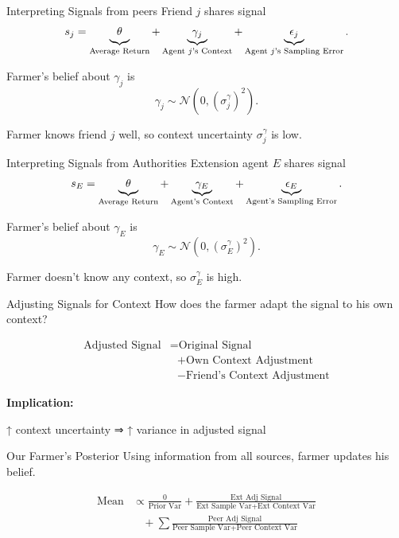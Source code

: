 \documentclass[
  ignorenonframetext,
]{beamer}
\begin{document}
\begin{frame}{Interpreting Signals from peers}
\protect\hypertarget{interpreting-signals-from-peers}{}
Friend \(j\) shares signal \[
s_j = \underbrace{\theta\vphantom{\gamma_j}}_{\text{Average Return}} + \underbrace{\gamma_j}_{\text{Agent $j$'s Context}} + \underbrace{\epsilon_j}_{\text{Agent $j$'s Sampling Error}}.
\]

Farmer's belief about \(\gamma_j\) is \[
\gamma_j \sim \mathcal{N}\left(0, (\sigma_j^\gamma)^2\right).
\]

Farmer knows friend \(j\) well, so context uncertainty
\(\sigma_j^\gamma\) is low.
\end{frame}

\begin{frame}{Interpreting Signals from Authorities}
\protect\hypertarget{interpreting-signals-from-authorities}{}
Extension agent \(E\) shares signal \[
s_E = \underbrace{\theta\vphantom{\gamma_E}}_{\text{Average Return}} + \underbrace{\gamma_E}_{\text{Agent's Context}} + \underbrace{\epsilon_E}_{\text{Agent's Sampling Error}}.
\]

Farmer's belief about \(\gamma_E\) is \[
\gamma_E \sim \mathcal{N}\left(0, (\sigma_E^\gamma)^2\right).
\]

Farmer doesn't know any context, so \(\sigma_E^\gamma\) is high.
\end{frame}

\begin{frame}{Adjusting Signals for Context}
\protect\hypertarget{adjusting-signals-for-context}{}
How does the farmer adapt the signal to his own context?

\[\begin{aligned}
\text{Adjusted Signal} &= \text{Original Signal} \\
& \ \ \  + \text{Own Context Adjustment} \\
& \ \ \  - \text{Friend's Context Adjustment}
\end{aligned}\]

\textbf{Implication:}

↑ context uncertainty ⇒ ↑ variance in adjusted signal
\end{frame}

\begin{frame}{Our Farmer's Posterior}
\protect\hypertarget{our-farmers-posterior}{}
Using information from all sources, farmer updates his belief.

\[\begin{aligned}
\text{Mean} &\propto \frac{0}{\text{Prior Var}}  + \frac{\text{Ext Adj Signal}}{\text{Ext Sample Var} + \text{Ext Context Var}} \\
 & \ \ \ \ + \sum \frac{\text{Peer Adj Signal}}{\text{Peer Sample Var} + \text{Peer Context Var}} 
\end{aligned}\]
\end{frame}
\end{document}
